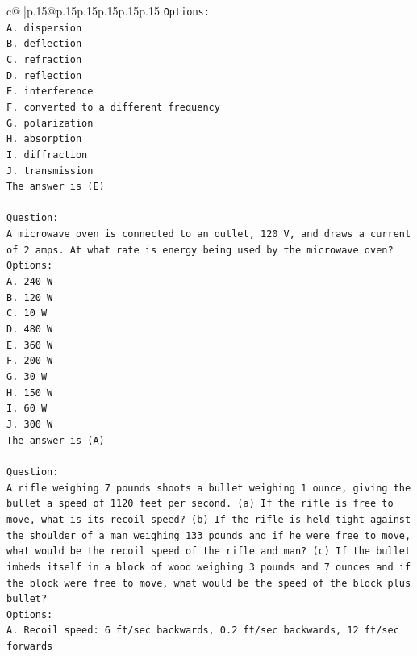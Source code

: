 \documentclass{article}
\begin{document}
{\begin{supertabular}{c@{$\;$}|p{.15\linewidth}@{}p{.15\linewidth}p{.15\linewidth}p{.15\linewidth}p{.15\linewidth}p{.15\linewidth}}
{{{\texttt{Options:} \\
\texttt{A. dispersion} \\
\texttt{B. deflection} \\
\texttt{C. refraction} \\
\texttt{D. reflection} \\
\texttt{E. interference} \\
\texttt{F. converted to a different frequency} \\
\texttt{G. polarization} \\
\texttt{H. absorption} \\
\texttt{I. diffraction} \\
\texttt{J. transmission} \\
\texttt{The answer is (E)} \\
\\ 
\texttt{Question:} \\
\texttt{A microwave oven is connected to an outlet, 120 V, and draws a current of 2 amps. At what rate is energy being used by the microwave oven?} \\
\texttt{Options:} \\
\texttt{A. 240 W} \\
\texttt{B. 120 W} \\
\texttt{C. 10 W} \\
\texttt{D. 480 W} \\
\texttt{E. 360 W} \\
\texttt{F. 200 W} \\
\texttt{G. 30 W} \\
\texttt{H. 150 W} \\
\texttt{I. 60 W} \\
\texttt{J. 300 W} \\
\texttt{The answer is (A)} \\
\\ 
\texttt{Question:} \\
\texttt{A rifle weighing 7 pounds shoots a bullet weighing 1 ounce, giving the bullet a speed of 1120 feet per second. (a) If the rifle is free to move, what is its recoil speed? (b) If the rifle is held tight against the shoulder of a man weighing 133 pounds and if he were free to move, what would be the recoil speed of the rifle and man? (c) If the bullet imbeds itself in a block of wood weighing 3 pounds and 7 ounces and if the block were free to move, what would be the speed of the block plus bullet?} \\
\texttt{Options:} \\
\texttt{A. Recoil speed: 6 ft/sec backwards, 0.2 ft/sec backwards, 12 ft/sec forwards} \\
}}}
\end{supertabular}}
\end{document}
